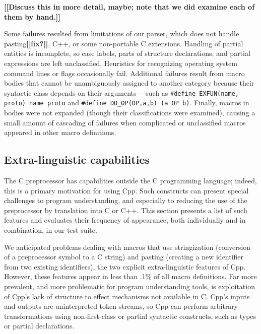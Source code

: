 \documentclass[10pt]{article}
\newcommand{\comment}[1]{\textbf{[[#1]]}}
\begin{document}
\begin{description}
\comment{Discuss this in more detail, maybe; note that we did examine each
of them by hand.}

  Some failures resulted from limitations of our parser, which does not
  handle pasting\comment{fix?}, C++, or some non-portable C extensions.  Handling of
  partial entities is incomplete, so case labels, parts of structure
  declarations, and partial expressions are left unclassified.  Heuristics
  for recognizing operating system command lines or flags occasionally
  fail.  Additional failures result from macro bodies that cannot be
  unambiguously assigned to another category because their syntactic class
  depends on their arguments\,---\,such as {\tt \#define EXFUN(name, proto)
  name proto} and {\tt \#define
\verb|DO_OP|(OP,a,b) (a OP b)}.  Finally, macros in bodies were not
expanded (though their classifications were examined), causing a small
amount of cascading of failures when complicated or unclassified macros
appeared in other macro definitions.

\end{description}







\subsection{Extra-linguistic capabilities}
\label{sec:extra-linguistic}

The C preprocessor has capabilities outside the C programming language;
indeed, this is a primary motivation for using Cpp.  Such constructs can
present special challenges to program understanding, and especially to
reducing the use of the preprocessor by translation into C or C++.  This
section
presents a list of such features and evaluates their frequency of
appearance, both individually and in combination, in our test suite.

We anticipated problems dealing with macros that use stringization
(conversion of a preprocessor symbol to a C string) and
pasting (creating a new identifier from two existing identifiers), the two
explicit extra-linguistic features of Cpp.  However, these
features appear in less than .1\% of all macro
definitions.  Far more prevalent, and more problematic for program
understanding tools, is exploitation of Cpp's lack of structure to effect
mechanisms not available in C\@.  Cpp's inputs and outputs are
uninterpreted token streams, so Cpp can perform arbitrary transformations
using non-first-class or partial syntactic constructs, such as types or
partial declarations.
\end{document}
